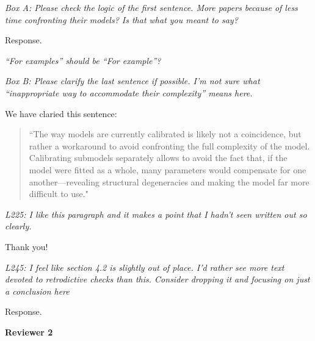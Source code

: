 \documentclass[11pt,letter]{article}
\begin{document}
\begin{mybox}
\emph{Box A: Please check the logic of the first sentence. More papers because of less time confronting their models? Is that what you meant to say?}
\end{mybox} 

Response.

\begin{mybox}
\emph{“For examples” should be “For example”?}
\end{mybox} 


\begin{mybox}
\emph{Box B: Please clarify the last sentence if possible. I’m not sure what “inappropriate way to accommodate their complexity” means here.}
\end{mybox}

We have claried this sentence:
\begin{quote}
``The way models are currently calibrated is likely not a coincidence, but rather a workaround to avoid confronting the full complexity of the model. Calibrating submodels separately allows to avoid the fact that, if the model were fitted as a whole, many parameters would compensate for one another---revealing structural degeneracies and making the model far more difficult to use."
\end{quote}

\begin{mybox}
\emph{L225: I like this paragraph and it makes a point that I hadn’t seen written out so clearly.}
\end{mybox}

Thank you!

\begin{mybox}
\emph{L245: I feel like section 4.2 is slightly out of place. I’d rather see more text devoted to retrodictive checks than this. Consider dropping it and focusing on just a conclusion here}
\end{mybox}

Response. %

{\bf Reviewer 2}
\end{document}
